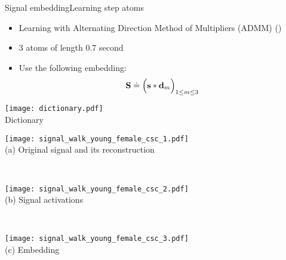 \begin{frame}{Signal embedding}{Learning step atoms}

\renewcommand{\ratio}{0.9}
\centering
\begin{minipage}[t]{0.45\linewidth}
    \vspace{0pt}
    \begin{itemize}
        \item Learning with Alternating Direction Method of Multipliers (ADMM) (\citet{bristow2013fast})
            \item 3 atoms of length 0.7 second

        \pause[3]
        \item Use the following embedding:
        \begin{equation*}\label{eq: convolutional embedding}
        \mathbf{S} \doteq \Big( \mathbf{s} * \mathbf{d}_m\Big)_{1 \le m \le 3 }
        \end{equation*}
    \end{itemize}

    \centering
    \texttt{[image: dictionary.pdf]}\\
    \smallskip
    {\small Dictionary}
\end{minipage}
\begin{minipage}[t]{0.54\linewidth}
    \vspace{0pt}
    \renewcommand{\ratio}{0.8}
        \begin{minipage}{\linewidth}
            \centering
            \texttt{[image: signal\_walk\_young\_female\_csc\_1.pdf]}\\
            {\small (a)\; Original signal and its reconstruction}
        \end{minipage}\\
        \begin{minipage}{\linewidth}
            \centering
            \texttt{[image: signal\_walk\_young\_female\_csc\_2.pdf]}\\
            {\small (b)\; Signal activations}
        \end{minipage}\\
        \begin{minipage}{\linewidth}
            \centering
            \texttt{[image: signal\_walk\_young\_female\_csc\_3.pdf]}\\
            {\small (c)\; Embedding}
        \end{minipage}
\end{minipage}

\end{frame}

